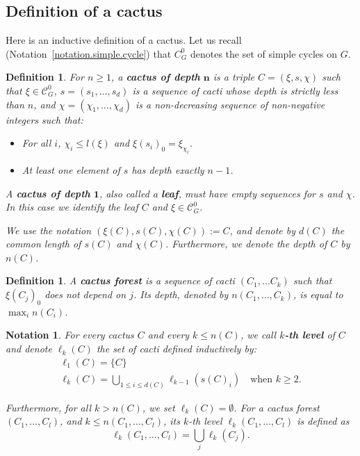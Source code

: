 \documentclass{article}
\newtheorem{definition}[theorem]{Definition}
\newtheorem{notation}[theorem]{Notation}
\begin{document}
\subsection{Definition of a cactus\label{section.cactus.rep}}

Here is an inductive definition of a cactus. Let us recall (Notation~\ref{notation.simple.cycle}) that $C_G^0$ denotes the set of simple cycles on $G$.

\begin{definition}
For $n \geq 1$, a \textbf{cactus of depth} $\boldsymbol{n}$ is a triple $C=(\xi,s,\chi)$ such that $\xi \in \mathcal{C}^0_G$, $s=(s_1, \dots , s_d)$ is a sequence of cacti whose depth is strictly less than $n$, and $\chi = (\chi_1, \dots , \chi_d)$ is a non-decreasing sequence of non-negative integers such that: 

\begin{itemize}
\item For all $i$, $\chi_i \le l(\xi)$ and $\xi(s_i)_0 = \xi_{\chi_i}$.
\item At least one element of $s$ has depth exactly $n-1$. 
\end{itemize}

A \textbf{cactus of depth} $\boldsymbol{1}$, also called a \textbf{leaf}, must have empty sequences for $s$ and $\chi$. In this case we identify the leaf $C$ and $\xi \in \mathcal{C}_G^0$.

We use the notation $(\xi(C),s(C),\chi(C)):=C$, and denote by $d(C)$ the common length of $s(C)$ and $\chi(C)$. Furthermore, we denote the depth of $C$ by $n(C)$.
\end{definition}

\begin{definition}
A \textbf{cactus forest} is a sequence of cacti $(C_1, \ldots C_k)$ such that $\xi(C_j)_0$ does not depend on $j$. Its depth, denoted by $n(C_1,\ldots,C_k)$, is equal to $\max_i n(C_i)$.
\end{definition}


\begin{notation}
For every cactus $C$ and every $k \le n(C)$, we call \textbf{$k$-th level} of $C$ and denote $\ell_k(C)$ the set of cacti defined inductively by:
\[\begin{array}{ll}
\ell_1(C)=\{C\}\\
\ell_k(C) = \bigcup_{1\le i \le d(C)} \ell_{k-1}(s(C)_i)\quad \text{when }k \ge2. 
\end{array}\]

Furthermore, for all $k > n(C)$, we set $\ell_k(C) = \emptyset$.
For a cactus forest $(C_1,\ldots,C_l)$, and $k \le n(C_1,\ldots,C_l)$, its $k$-th level $\ell_k(C_1,\ldots,C_l)$ is defined as 
\[\ell_k(C_1,\ldots,C_l) = \bigcup_{j} \ell_k(C_j).\]

\end{notation}
\end{document}
